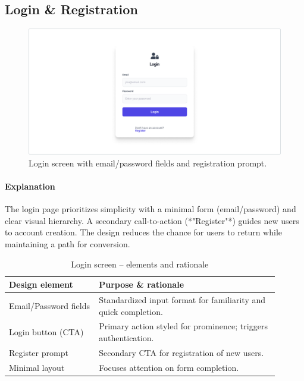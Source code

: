 \documentclass[11pt,a4paper]{article}
\begin{document}

	\subsection{Login \& Registration}\label{subsec:login-register}

	\begin{figure}[H]
		\centering
		\includegraphics[width=1.0\linewidth]{pictures/main/RegisterAccount_Figma}%
		\caption{Login screen with email/password fields and registration prompt.}
		\label{fig:ui-login}
	\end{figure}

	\paragraph{Explanation}%
	The login page prioritizes simplicity with a minimal form (email/password) and clear visual hierarchy.
	A secondary call-to-action (*"Register"*) guides new users to account creation. The design reduces the chance for users to return while maintaining a path for conversion.

	\begin{table}[H]
		\centering
		\caption{Login screen – elements and rationale}
		\label{tab:login-elements}
		\begin{tabular}{p{0.30\linewidth} p{0.60\linewidth}}
			\toprule
			\textbf{Design element} & \textbf{Purpose \& rationale} \\ \midrule
			Email/Password fields   & Standardized input format for familiarity and quick completion. \\
			Login button (CTA)      & Primary action styled for prominence; triggers authentication. \\
			Register prompt        & Secondary CTA for registration of new users. \\
			Minimal layout         & Focuses attention on form completion. \\
			\bottomrule
		\end{tabular}
	\end{table}
	
\end{document}
